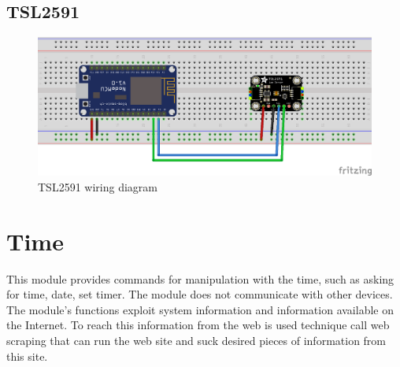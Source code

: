 \subsection{TSL2591}


\begin{figure}[H]
	\centering
	\includegraphics[width=\textwidth]{img/tsl2591_schema.png}
	\caption{TSL2591 wiring diagram}
	\label{fig:tsl2591_schema}
\end{figure}

\section{Time}

This module provides commands for manipulation with the time, such as asking for time, date, set timer. The module does not communicate with other devices. The module's functions exploit system information and information available on the Internet. To reach this information from the web is used technique call web scraping that can run the web site and suck desired pieces of information from this site. 


